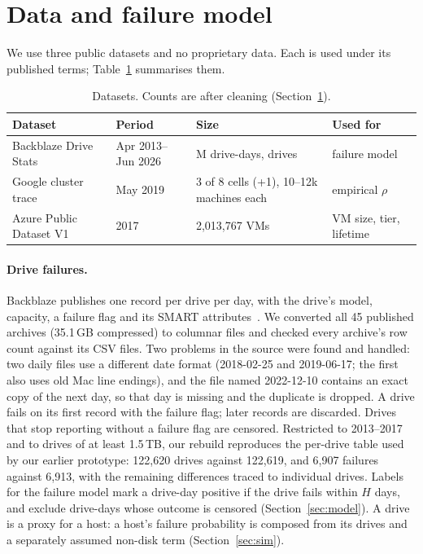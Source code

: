 
\section{Data and failure model}
\label{sec:data}

We use three public datasets and no proprietary data. Each is used under its published terms;
Table~\ref{tab:data} summarises them.

\begin{table}[t]
  \centering
  \small
  \begin{tabular}{@{}llll@{}}
    \toprule
    Dataset & Period & Size & Used for \\
    \midrule
    Backblaze Drive Stats~\cite{backblaze2026drivestats} & Apr 2013--Jun 2026 & \VDriveDaysM{}M drive-days, \VDrives{} drives & failure model \\
    Google cluster trace~\cite{googleclusterdata2019,tirmazi2020borg} & May 2019 & 3 of 8 cells (+1), 10--12k machines each & empirical $\rho$ \\
    Azure Public Dataset V1~\cite{azurepublicdataset,cortez2017resource} & 2017 & 2{,}013{,}767 VMs & VM size, tier, lifetime \\
    \bottomrule
  \end{tabular}
  \caption{Datasets. Counts are after cleaning (Section~\ref{sec:data}).}
  \label{tab:data}
\end{table}

\paragraph{Drive failures.}
Backblaze publishes one record per drive per day, with the drive's model, capacity, a failure
flag and its SMART attributes~\cite{backblaze2026drivestats}. We converted all 45 published
archives (35.1\,GB compressed) to columnar files and checked every archive's row count against
its CSV files. Two problems in the source were found and handled: two daily files use a
different date format (2018-02-25 and 2019-06-17; the first also uses old Mac line endings), and the file named
2022-12-10 contains an exact copy of the next day, so that day is missing and the duplicate is
dropped. A drive fails on its first record with the failure flag; later records are discarded.
Drives that stop reporting without a failure flag are censored. Restricted to 2013--2017 and to
drives of at least 1.5\,TB, our rebuild reproduces the per-drive table used by our earlier
prototype: 122{,}620 drives against 122{,}619, and 6{,}907 failures against 6{,}913, with the
remaining differences traced to individual drives. Labels for the failure model mark a
drive-day positive if the drive fails within $H$ days, and exclude drive-days whose outcome is
censored (Section~\ref{sec:model}). A drive is a proxy for a host: a host's failure probability is
composed from its drives and a separately assumed non-disk term (Section~\ref{sec:sim}).


